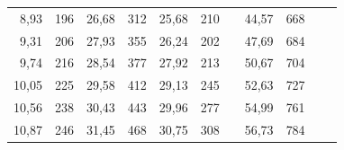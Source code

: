 \documentclass[a4paper,12pt]{article} %
\begin{document}
\begin{table}[]
\begin{tabular}{|rr|rr|rr|lrrll}
\multicolumn{1}{|r|}{8,93}          & 196                                  & \multicolumn{1}{r|}{26,68}         & 312                                  & \multicolumn{1}{r|}{25,68}         & 210                                  & \multicolumn{1}{l|}{} & \multicolumn{1}{r|}{44,57}         & \multicolumn{1}{r|}{668}             &                                    &                                      \\ \cline{1-6} \cline{8-9}
\multicolumn{1}{|r|}{9,31}          & 206                                  & \multicolumn{1}{r|}{27,93}         & 355                                  & \multicolumn{1}{r|}{26,24}         & 202                                  & \multicolumn{1}{l|}{} & \multicolumn{1}{r|}{47,69}         & \multicolumn{1}{r|}{684}             &                                    &                                      \\ \cline{1-6} \cline{8-9}
\multicolumn{1}{|r|}{9,74}          & 216                                  & \multicolumn{1}{r|}{28,54}         & 377                                  & \multicolumn{1}{r|}{27,92}         & 213                                  & \multicolumn{1}{l|}{} & \multicolumn{1}{r|}{50,67}         & \multicolumn{1}{r|}{704}             &                                    &                                      \\ \cline{1-6} \cline{8-9}
\multicolumn{1}{|r|}{10,05}         & 225                                  & \multicolumn{1}{r|}{29,58}         & 412                                  & \multicolumn{1}{r|}{29,13}         & 245                                  & \multicolumn{1}{l|}{} & \multicolumn{1}{r|}{52,63}         & \multicolumn{1}{r|}{727}             &                                    &                                      \\ \cline{1-6} \cline{8-9}
\multicolumn{1}{|r|}{10,56}         & 238                                  & \multicolumn{1}{r|}{30,43}         & 443                                  & \multicolumn{1}{r|}{29,96}         & 277                                  & \multicolumn{1}{l|}{} & \multicolumn{1}{r|}{54,99}         & \multicolumn{1}{r|}{761}             &                                    &                                      \\ \cline{1-6} \cline{8-9}
\multicolumn{1}{|r|}{10,87}         & 246                                  & \multicolumn{1}{r|}{31,45}         & 468                                  & \multicolumn{1}{r|}{30,75}         & 308                                  & \multicolumn{1}{l|}{} & \multicolumn{1}{r|}{56,73}         & \multicolumn{1}{r|}{784}             &                                    &                                      \\ \cline{1-6} \cline{8-9}

\end{tabular}
\end{table}
\end{document}
